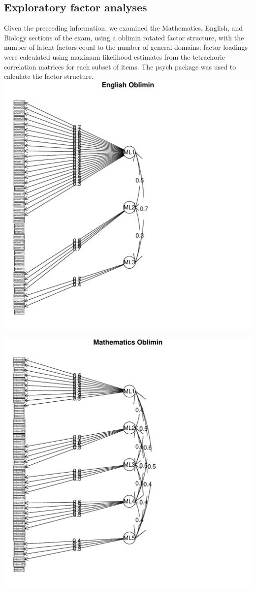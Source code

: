 \documentclass{article}\usepackage[]{graphicx}\usepackage[]{color}
\makeatletter
\def\maxwidth{ %
  \ifdim\Gin@nat@width>\linewidth
    \linewidth
  \else
    \Gin@nat@width
  \fi
}
\newenvironment{knitrout}{}{} %
\makeatother
\begin{document}
\subsection{Exploratory factor analyses}
Given the preceeding information, we examined the Mathematics, English, and Biology sections of the exam, using a oblimin rotated factor structure, with the number of latent factors equal to the number of general domains; factor loadings were calculated using maximum likelihood estimates from the tetrachoric correlation matrices for each subset of items. The psych package was used to calculate the factor structure.
\begin{knitrout}
\color{fgcolor}
\includegraphics[width=\maxwidth]{figure/unnamed-chunk-11} 

\includegraphics[width=\maxwidth]{figure/unnamed-chunk-12} 


\end{knitrout}
\end{document}
